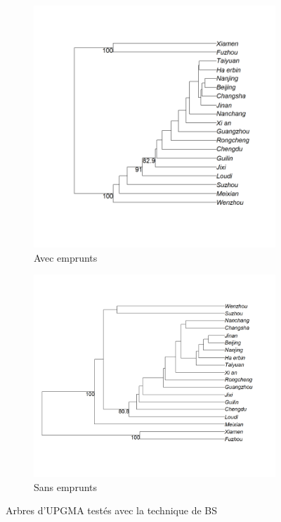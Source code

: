 \documentclass{scrbook}
\newcounter{c}[subsubsection]
\begin{document}
\begin{sloppypar}
\begin{figure}[htbp]
\flushleft
\begin{subfigure}{.5\textwidth}
\centering
\includegraphics[scale=.4]{Figure/UPGMA_BS_with}
\caption{Avec emprunts}
\end{subfigure}
\begin{subfigure}{.5\textwidth}
\centering
\includegraphics[scale=.4]{Figure/UPGMA_BS_without}
\caption{Sans emprunts}
\end{subfigure}
\caption{Arbres d'UPGMA testés avec la technique de BS}
\label{Fig:UPGMA_BS}
\end{figure}


\end{sloppypar}
\end{document}

